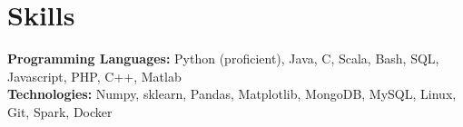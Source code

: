 \documentclass[letterpaper,11pt]{article}
\newcommand{\resumeListStart}{\begin{itemize}[label={},leftmargin=*]}
\newcommand{\resumeListEnd}{\end{itemize}}
\begin{document}
        
        \section{Skills}
        \textbf{Programming Languages:} {\space Python (proficient), Java, C, Scala, Bash, SQL, Javascript, PHP, C++, Matlab}\\
        \textbf{Technologies:} {\space Numpy, sklearn, Pandas, Matplotlib, MongoDB, MySQL, Linux, Git, Spark, Docker}\\
              
      
\end{document}
